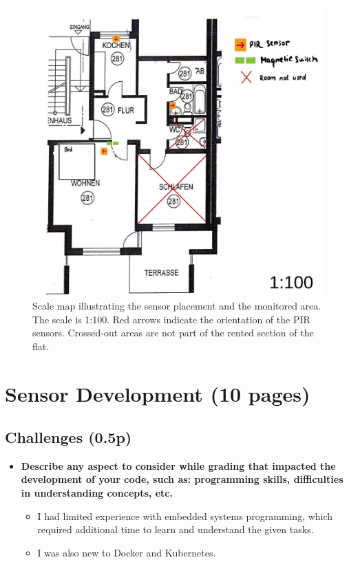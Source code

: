 \documentclass[A4,10pt]{article}
\begin{document}
\begin{figure}[H]
	\centering
	\includegraphics[width=1\textwidth]{grundriss.jpeg}
	\caption{Scale map illustrating the sensor placement and the monitored area. The scale is 1:100. Red arrows indicate the orientation of the PIR sensors. Crossed-out areas are not part of the rented section of the flat.}
	\label{fig:scale_map}
\end{figure}

\section{Sensor Development (10 pages)}

\subsection{Challenges (0.5p)}

\begin{itemize}
	\item \textbf{Describe any aspect to consider while grading that impacted the development of your code, such as: programming skills, difficulties in understanding concepts, etc.}
	\begin{itemize}
		\item I had limited experience with embedded systems programming, which required additional time to learn and understand the given tasks.
		\item I was also new to Docker and Kubernetes.
	\end{itemize}
\end{itemize}
\end{document}
